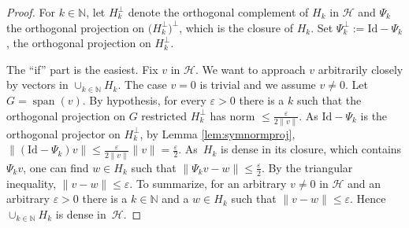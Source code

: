\documentclass[pdftex]{sigma}%
\DeclareMathOperator{\psan}{span}
\newcommand{\hilH}{\mathcal H}
\newcommand{\norm}[1]{\lVert #1\rVert}
\newcommand{\kN}{k\in \mathbb{N}}
\newcommand{\Id}{\mathrm{Id}}
\begin{document}
\begin{proof}
For $\kN$, let $H_k^{\perp}$ denote the orthogonal complement of $H_k$ in $\hilH$ and $\Psi_k$ the orthogonal projection on $\big(H_k^{\perp}\big)^{\perp}$, which is the closure of $H_k$. Set $\Psi_k^{\perp}:=\Id -\Psi_k$, the orthogonal projection on $H_k^{\perp}$.

The ``if'' part is the easiest. Fix $v$ in $\hilH$. We want to approach $v$ arbitrarily closely by vectors in $\cup_{\kN} H_k$. The case $v=0$ is trivial and we assume $v\neq 0$. Let $G=\psan (v)$. By hypothesis, for every $\varepsilon >0$ there is a $k$ such that the orthogonal projection on $G$ restricted $H_k^{\perp}$ has norm $\leq \frac{\varepsilon}{2\norm{v}}$. As $\Id -\Psi_k$ is the orthogonal projector on $H_k^{\perp}$, by Lemma \ref{lem:symnormproj}, $\norm{(\Id -\Psi_k)v} \leq \frac{\varepsilon}{2\norm{v}}\norm{v}=\frac{\varepsilon}{2}$. As~$H_k$ is dense in its closure, which contains $\Psi_kv$, one can find $w\in H_k$ such that $\norm{\Psi_kv-w}\leq \frac{\varepsilon}{2}$. By the triangular inequality, $\norm{v-w} \leq \varepsilon$. To summarize, for an arbitrary $v\neq 0$ in $\hilH$ and an arbitrary $\varepsilon >0$ there is a $\kN$ and a $w\in H_k$ such that $\norm{v-w} \leq \varepsilon$. Hence $\cup_{\kN} H_k$ is dense in~$\hilH$.


\end{proof}
\end{document}
